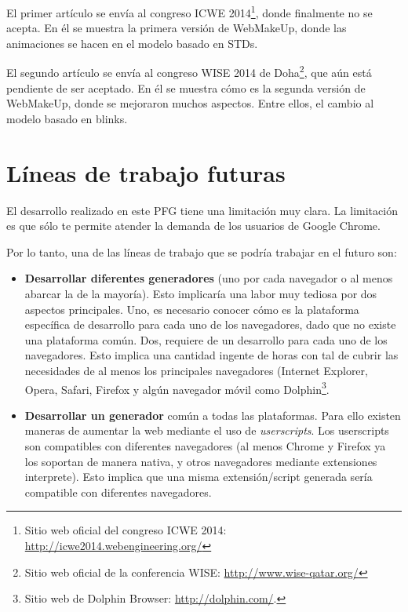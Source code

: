 El primer artículo \cite{ICWEWebMakeUp} se envía al congreso ICWE 2014\footnote{Sitio web oficial del congreso ICWE 2014: \url{http://icwe2014.webengineering.org/}}, donde finalmente no se acepta. En él se muestra la primera versión de WebMakeUp, donde las animaciones se hacen en el modelo basado en STDs.

El segundo artículo \cite{WISEWebMakeUp} se envía al congreso WISE 2014 de Doha\footnote{Sitio web oficial de la conferencia WISE: \url{http://www.wise-qatar.org/}}, que aún está pendiente de ser aceptado. En él se muestra cómo es la segunda versión de WebMakeUp, donde se mejoraron muchos aspectos. Entre ellos, el cambio al modelo basado en blinks.

\section{Líneas de trabajo futuras}
\label{sec:TrabajoFuturo}

El desarrollo realizado en este PFG tiene una limitación muy clara. La limitación es que sólo te permite atender la demanda de los usuarios de Google Chrome.

Por lo tanto, una de las líneas de trabajo que se podría trabajar en el futuro son:
\begin{itemize}
\item{\textbf{Desarrollar diferentes generadores} (uno por cada navegador o al menos abarcar la de la mayoría). Esto implicaría una labor muy tediosa por dos aspectos principales. Uno, es necesario conocer cómo es la plataforma específica de desarrollo para cada uno de los navegadores, dado que no existe una plataforma común. Dos, requiere de un desarrollo para cada uno de los navegadores. Esto implica una cantidad ingente de horas con tal de cubrir las necesidades de al menos los principales navegadores (Internet Explorer, Opera, Safari, Firefox y algún navegador móvil como Dolphin\footnote{Sitio web de Dolphin Browser: \url{http://dolphin.com/}.}.}
\item{\textbf{Desarrollar un generador} común a todas las plataformas. Para ello existen maneras de aumentar la web mediante el uso de \emph{userscripts}. Los userscripts son compatibles con diferentes navegadores (al menos Chrome y Firefox ya los soportan de manera nativa, y otros navegadores mediante extensiones interprete). Esto implica que una misma extensión/script generada sería compatible con diferentes navegadores.}
\end{itemize}

